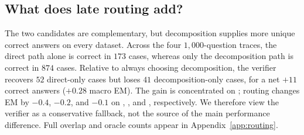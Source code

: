 \subsection{What does late routing add?}
\label{sec:routing-results}

The two candidates are complementary, but decomposition supplies more unique
correct answers on every dataset. Across the four \(1{,}000\)-question traces,
the direct path alone is correct in \(173\) cases, whereas only the
decomposition path is correct in \(874\) cases. Relative to always choosing
decomposition, the verifier recovers \(52\) direct-only cases but loses \(41\)
decomposition-only cases, for a net \(+11\) correct answers
(\(+0.28\) macro EM). The gain is concentrated on \hotpot{}; routing changes
EM by \(-0.4\), \(-0.2\), and \(-0.1\) on \twowiki{}, \musique{}, and
\popqa{}, respectively. We therefore view the verifier as a conservative
fallback, not the source of the main performance difference. Full overlap and
oracle counts appear in Appendix~\ref{app:routing}.
